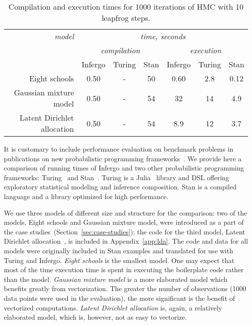 \documentclass[sigplan,review,10pt,anonymous]{acmart}
\begin{document}
\begin{sloppypar}
\begin{table*}
	\begin{tabular}{r | c |  c | c | c | c | c | }
		{\it model}         & \multicolumn{6}{c|}{\it time, seconds} \\
					        & \multicolumn{3}{c|}{\it compilation} & \multicolumn{3}{c|}{\it execution} \\
					        & Infergo & Turing & Stan              & Infergo  & Turing & Stan    \\\hline
              Eight schools & 0.50    & -      & 50                & 0.60     & 2.8    & 0.12    \\
     Gaussian mixture model & 0.50    & -      & 54                & 32       & 14     & 4.9     \\
Latent Dirichlet allocation & 0.50    & -      & 54                & 8.9      & 12     & 3.7     \\ 
	\end{tabular}
\caption{Compilation and execution times for 1000 iterations 
	of HMC with 10 leapfrog steps.}
\label{tab:memory-runtime}
\end{table*}
It is customary to include performance evaluation on benchmark
problems in publications on new probabilistic programming
frameworks~\cite{PW14,WVM14,TMY+16,GXG18}. We provide here a
comparison of running times of Infergo and two other probabilistic
programming frameworks: Turing~\cite{GXG18} and
Stan~\cite{Stan17}. Turing is a Julia~\cite{Julia14} library
and DSL offering exploratory statistical modeling  and
inference composition. Stan is a compiled language and a library
optimized for high performance.

We use three models of different size and structure for the
comparison: two of the models, Eight schools and Gaussian
mixture model, were introduced as a part of the case
studies~(Section~\ref{sec:case-studies}); the code for the third
model, Latent Dirichlet allocation~\cite{BNG03}, is included in
Appendix~\ref{app:lda}. The code and data for all models were
originally included in Stan examples and translated for use
with Turing and Infergo. \textit{Eight schools} is the smallest model.
One may expect that most of the time execution time is spent in
executing the boilerplate code rather than the model. \textit{Gaussian
mixture model} is a more elaborated model which benefits greatly
from vectorization. The greater the number of observations (1000
data points were used in the evaluation), the more significant
is the benefit of vectorized computations. \textit{Latent
Dirichlet allocation} is, again, a relatively elaborated model,
which is, however, not as easy to vectorize. 


\end{sloppypar}
\end{document}
